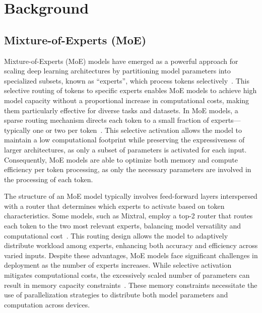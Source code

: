 \section{Background}\label{sec:background}

\subsection{Mixture-of-Experts (MoE)}
Mixture-of-Experts (MoE) models have emerged as a powerful approach for scaling deep learning architectures by partitioning model parameters into specialized subsets, known as “experts”, which process tokens selectively~\cite{gemma, switchtransformer, mixtral,gshard,shazeer2017outrageously,deepspeed-moe}. 
%
This selective routing of tokens to specific experts enables MoE models to achieve high model capacity without a proportional increase in computational costs, making them particularly effective for diverse tasks and datasets.
%
In MoE models, a sparse routing mechanism directs each token to a small fraction of experts—typically one or two per token~\cite{switchtransformer,gshard}.
%
This selective activation allows the model to maintain a low computational footprint while preserving the expressiveness of larger architectures, as only a subset of parameters is activated for each input. 
%
Consequently, MoE models are able to optimize both memory and compute efficiency per token processing, as only the necessary parameters are involved in the processing of each token.

The structure of an MoE model typically involves feed-forward layers interspersed with a router that determines which experts to activate based on token characteristics. 
%
Some models, such as Mixtral, employ a top-2 router that routes each token to the two most relevant experts, balancing model versatility and computational cost~\cite{mixtral}.
%
This routing design allows the model to adaptively distribute workload among experts, enhancing both accuracy and efficiency across varied inputs. 
%
%
Despite these advantages, MoE models face significant challenges in deployment as the number of experts increases.
%
While selective activation mitigates computational costs, the excessively scaled number of parameters can result in memory capacity constraints~\cite{mcsmoe,hwang2024pre,huang2023towards,kim2021scalable}.
%
These memory constraints necessitate the use of parallelization strategies to distribute both model parameters and computation across devices.
%
%


